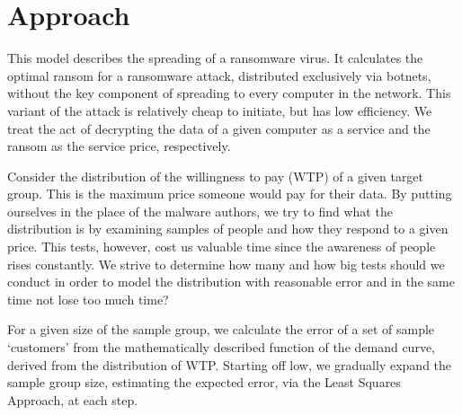 \documentclass[11pt, a4paper]{article}
\theoremstyle{definition}
\begin{document}
	\section{Approach}
		This model describes the spreading of a ransomware virus. It calculates the optimal ransom for a ransomware attack, distributed exclusively via botnets, without the key component of spreading to every computer in the network. This variant of the attack is relatively cheap to initiate, but has low efficiency.	We treat the act of decrypting the data of a given computer as a service and the ransom as the service price, respectively. \par
		Consider the distribution of the willingness to pay (WTP) of a given target group. This is the maximum price someone would pay for their data. By putting ourselves in the place of the malware authors, we try to find what the distribution is by examining samples of people and how they respond to a given price. This tests, however, cost us valuable time since the awareness of people rises constantly. We strive to determine how many and how big tests should we conduct in order to model the distribution with reasonable error and in the same time not lose too much time?\par
		For a given size of the sample group, we calculate the error of a set of sample `customers' from the mathematically described function of the demand curve, derived from the distribution of WTP. Starting off low, we gradually expand the sample group size, estimating the expected error, via the Least Squares Approach, at each step.
\end{document}
